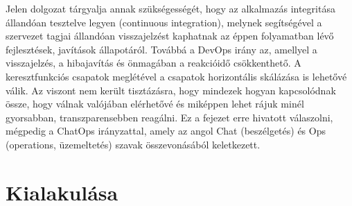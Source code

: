 
Jelen dolgozat tárgyalja annak szükségességét, hogy az alkalmazás integritása állandóan tesztelve legyen (continuous integration), melynek segítségével a szervezet tagjai állandóan visszajelzést kaphatnak az éppen folyamatban lévő fejlesztések, javítások állapotáról. Továbbá a DevOps irány az, amellyel a visszajelzés, a hibajavítás és önmagában a reakcióidő csökkenthető. A keresztfunkciós csapatok meglétével a csapatok horizontális skálázása is lehetővé válik. Az viszont nem került tisztázásra, hogy mindezek hogyan kapcsolódnak össze, hogy válnak valójában elérhetővé és miképpen lehet rájuk minél gyorsabban, transzparensebben reagálni. Ez a fejezet erre hivatott válaszolni, mégpedig a ChatOps irányzattal, amely az angol Chat (beszélgetés) és Ops (operations, üzemeltetés) szavak összevonásából keletkezett.

\section{Kialakulása}

